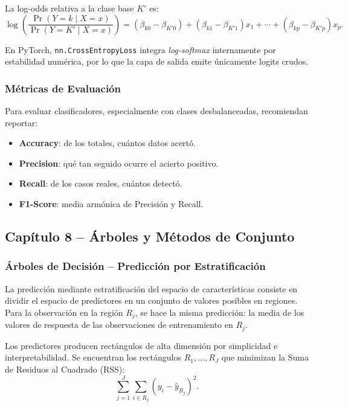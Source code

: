 \documentclass[12pt, a4paper]{article}
\begin{document}
La log-odds relativa a la clase base $K'$ es:
\begin{equation}
  \log\!\left(\frac{\Pr(Y=k \mid X=x)}{\Pr(Y=K' \mid X=x)}\right) =
  (\beta_{k0} - \beta_{K'0}) + (\beta_{k1} - \beta_{K'1})x_1
  + \cdots + (\beta_{kp} - \beta_{K'p})x_p.
\end{equation}

En PyTorch, \texttt{nn.CrossEntropyLoss} integra \textit{log-softmax}
internamente por estabilidad numérica, por lo que la capa de salida
emite únicamente logits crudos.

\subsubsection{Métricas de Evaluación}

Para evaluar clasificadores, especialmente con clases desbalanceadas,
\citet[Cap.~4]{islp2023} recomiendan reportar:
\begin{itemize}
  \item \textbf{Accuracy}: de los totales, cuántos datos acertó.
  \item \textbf{Precision}: qué tan seguido ocurre el acierto positivo.
  \item \textbf{Recall}: de los casos reales, cuántos detectó.
  \item \textbf{F1-Score}: media armónica de Precisión y Recall.
\end{itemize}

\subsection{Capítulo 8 -- Árboles y Métodos de Conjunto}
\label{subsec:cap8}

\subsubsection{Árboles de Decisión -- Predicción por Estratificación}

La predicción mediante estratificación del espacio de características
consiste en dividir el espacio de predictores en un conjunto de valores
posibles en regiones. Para la observación en la región $R_j$, se hace
la misma predicción: la media de los valores de respuesta de las
observaciones de entrenamiento en $R_j$.

Los predictores producen rectángulos de alta dimensión por simplicidad
e interpretabilidad. Se encuentran los rectángulos $R_1, \ldots, R_J$
que minimizan la Suma de Residuos al Cuadrado (RSS):
\begin{equation}
  \sum_{j=1}^{J} \sum_{i \in R_j} (y_i - \hat{y}_{R_j})^2.
\end{equation}
\end{document}
